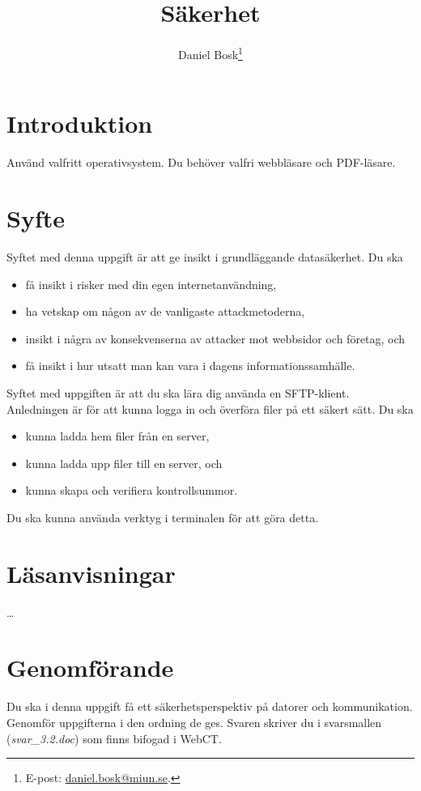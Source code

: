 \documentclass[11pt,a4paper]{miunasgn}
\title{Säkerhet}
\author{Daniel Bosk\footnote{%
	E-post: \href{mailto:daniel.bosk@miun.se}{daniel.bosk@miun.se}.
}}
\date{\svnId}
\begin{document}
\maketitle
\thispagestyle{foot}
\tableofcontents


\section{Introduktion}
\label{sec:Introduktion}
\noindent
Använd valfritt operativsystem.
Du behöver valfri webbläsare och PDF-läsare.


\section{Syfte}
\label{sec:Syfte}
\noindent
Syftet med denna uppgift är att ge insikt i grundläggande datasäkerhet.
Du ska
\begin{itemize}
	\item få insikt i risker med din egen internetanvändning,
	\item ha vetskap om någon av de vanligaste attackmetoderna,
	\item insikt i några av konsekvenserna av attacker mot webbsidor och
		företag, och
	\item få insikt i hur utsatt man kan vara i dagens informationssamhälle.
\end{itemize}

Syftet med uppgiften är att du ska lära dig använda en SFTP-klient.
Anledningen är för att kunna logga in och överföra filer på ett säkert sätt.
Du ska
\begin{itemize}
    \item kunna ladda hem filer från en server,
    \item kunna ladda upp filer till en server, och
	\item kunna skapa och verifiera kontrollsummor.
\end{itemize}
Du ska kunna använda verktyg i terminalen för att göra detta.


\section{Läsanvisningar}
\label{sec:Lasanvisningar}
\noindent
\dots


\section{Genomförande}
\label{sec:Genomforande}
\noindent
Du ska i denna uppgift få ett säkerhetsperspektiv på datorer och kommunikation.
Genomför uppgifterna i den ordning de ges.
Svaren skriver du i svarsmallen (\emph{svar\_3.2.doc}) som finns bifogad i
WebCT.
\end{document}
